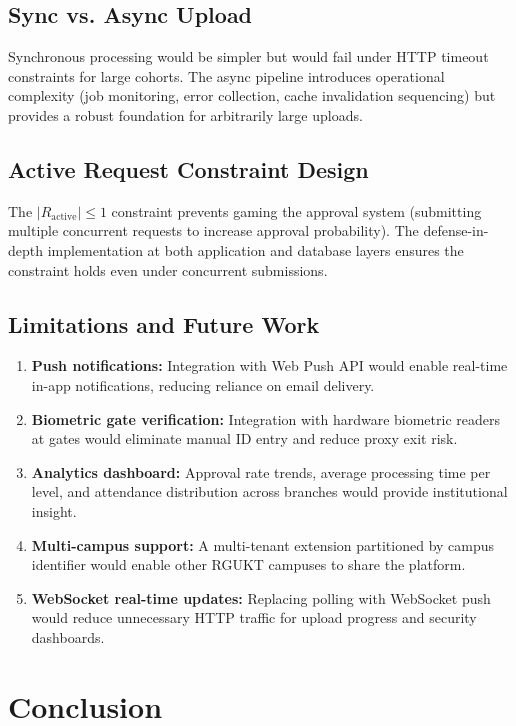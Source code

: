\documentclass[12pt,a4paper]{report}
\begin{document}
\section{Sync vs. Async Upload}

Synchronous processing would be simpler but would fail under HTTP timeout constraints for large cohorts. The async pipeline introduces operational complexity (job monitoring, error collection, cache invalidation sequencing) but provides a robust foundation for arbitrarily large uploads.

\section{Active Request Constraint Design}

The $|R_{\text{active}}| \leq 1$ constraint prevents gaming the approval system (submitting multiple concurrent requests to increase approval probability). The defense-in-depth implementation at both application and database layers ensures the constraint holds even under concurrent submissions.

\section{Limitations and Future Work}

\begin{enumerate}[label=(\arabic*)]
  \item \textbf{Push notifications:} Integration with Web Push API would enable real-time in-app notifications, reducing reliance on email delivery.
  \item \textbf{Biometric gate verification:} Integration with hardware biometric readers at gates would eliminate manual ID entry and reduce proxy exit risk.
  \item \textbf{Analytics dashboard:} Approval rate trends, average processing time per level, and attendance distribution across branches would provide institutional insight.
  \item \textbf{Multi-campus support:} A multi-tenant extension partitioned by campus identifier would enable other RGUKT campuses to share the platform.
  \item \textbf{WebSocket real-time updates:} Replacing polling with WebSocket push would reduce unnecessary HTTP traffic for upload progress and security dashboards.
\end{enumerate}

\chapter{Conclusion}
\end{document}
